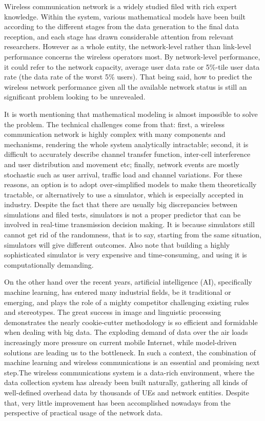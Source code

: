 \documentclass[conference,compsocconf]{IEEEtran}
\begin{document}
	Wireless communication network is a widely studied filed with rich expert knowledge. Within the system, various mathematical models have been built according to the different stages from the data generation to the final data reception, and each stage has drawn considerable attention from relevant researchers. However as a whole entity, the network-level  rather than link-level performance concerns the wireless operators most. By network-level performance, it could refer to the network capacity, average user data rate or 5\%-tile user data rate (the data rate of the worst 5\% users). That being said, how to predict the wireless network performance given all the available network status is still an significant problem looking to be unrevealed.
	
	It is worth mentioning that mathematical modeling is almost impossible to solve the problem. The technical challenges come from that: first, a wireless communication network is highly complex with many components and mechanisms, rendering the whole system analytically intractable; second, it is difficult to accurately describe channel transfer function, inter-cell interference and user distribution and movement etc; finally, network events are mostly stochastic such as user arrival, traffic load and channel variations. For these reasons, an option is to adopt over-simplified models to make them theoretically tractable, or alternatively to use a simulator, which is especially accepted in industry. Despite the fact that there are usually big discrepancies between simulations and filed tests, simulators is not a proper predictor that can be involved in real-time transmission decision making. It is because simulators still cannot get rid of the randomness, that is to say, starting from the same situation, simulators will give different outcomes. Also note that building a highly sophisticated simulator is very expensive and time-consuming, and using it is computationally demanding.
	
	On the other hand over the recent years, artificial intelligence (AI), specifically machine learning, has entered many industrial fields, be it traditional or emerging, and plays the role of a mighty competitor challenging existing rules and stereotypes. The great success in image and linguistic processing demonstrates the nearly cookie-cutter methodology is so efficient and formidable when dealing with big data. The exploding demand of data over the air loads increasingly more pressure on current mobile Internet, while model-driven solutions are leading us to the bottleneck. In such a context, the combination of machine learning and wireless communications is an essential and promising next step.The wireless communications system is a data-rich environment, where the data collection system has already been built naturally, gathering all kinds of well-defined overhead data by thousands of UEs and network entities. Despite that, very little improvement has been accomplished nowadays from the perspective of practical usage of the network data. 
	
\end{document}
